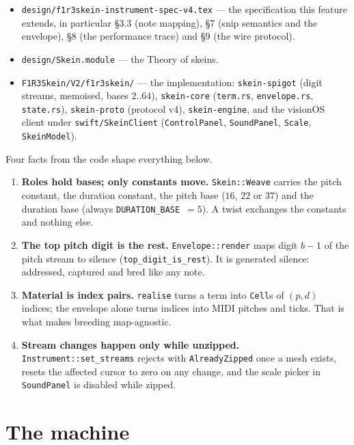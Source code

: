 \documentclass[11pt,a4paper]{article}
\theoremstyle{definition}
\theoremstyle{plain}
\theoremstyle{remark}
\begin{document}
\begin{itemize}[leftmargin=*,itemsep=2pt]
\item \texttt{design/f1r3skein-instrument-spec-v4.tex} --- the specification this feature extends,
  in particular \S3.3 (note mapping), \S7 (snip semantics and the envelope), \S8 (the performance
  trace) and \S9 (the wire protocol).
\item \texttt{design/Skein.module} --- the Theory of skeins.
\item \texttt{F1R3Skein/V2/f1r3skein/} --- the implementation: \texttt{skein-spigot} (digit
  streams, memoised, bases $2..64$), \texttt{skein-core} (\texttt{term.rs}, \texttt{envelope.rs},
  \texttt{state.rs}), \texttt{skein-proto} (protocol v4), \texttt{skein-engine}, and the visionOS
  client under \texttt{swift/SkeinClient} (\texttt{ControlPanel}, \texttt{SoundPanel},
  \texttt{Scale}, \texttt{SkeinModel}).
\end{itemize}

Four facts from the code shape everything below.
\begin{enumerate}[leftmargin=*,itemsep=2pt]
\item \textbf{Roles hold bases; only constants move.} \texttt{Skein::Weave} carries the pitch
  constant, the duration constant, the pitch base ($16$, $22$ or $37$) and the duration base (always
  \texttt{DURATION\_BASE}~$=5$). A twist exchanges the constants and nothing else.
\item \textbf{The top pitch digit is the rest.} \texttt{Envelope::render} maps digit $b-1$ of the
  pitch stream to silence (\texttt{top\_digit\_is\_rest}). It is generated silence: addressed,
  captured and bred like any note.
\item \textbf{Material is index pairs.} \texttt{realise} turns a term into \texttt{Cell}s of
  $(p,d)$ indices; the envelope alone turns indices into MIDI pitches and ticks. That is what makes
  breeding map-agnostic.
\item \textbf{Stream changes happen only while unzipped.} \texttt{Instrument::set\_streams} rejects
  with \texttt{AlreadyZipped} once a mesh exists, resets the affected cursor to zero on any change,
  and the scale picker in \texttt{SoundPanel} is disabled while zipped.
\end{enumerate}

\section{The machine}
\end{document}
